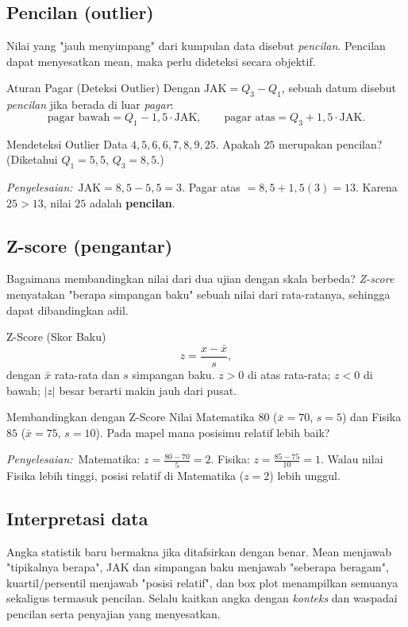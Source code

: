 \documentclass[11pt,a4paper]{report}
\theoremstyle{gaya}
\newcommand{\jawab}{\par\smallskip\noindent\textit{\textcolor{oranye}{Penyelesaian:}}\ }
\begin{document}
\subsection*{Pencilan (outlier)}
Nilai yang "jauh menyimpang" dari kumpulan data disebut \emph{pencilan}. Pencilan dapat menyesatkan mean, maka perlu dideteksi secara objektif.

\begin{konsep}{Aturan Pagar (Deteksi Outlier)}
Dengan $\text{JAK}=Q_3-Q_1$, sebuah datum disebut \emph{pencilan} jika berada di luar \emph{pagar}:
\[
\text{pagar bawah}=Q_1-1{,}5\cdot\text{JAK},\qquad
\text{pagar atas}=Q_3+1{,}5\cdot\text{JAK}.
\]
\end{konsep}

\begin{contoh}{Mendeteksi Outlier}
Data $4,5,6,6,7,8,9,25$. Apakah $25$ merupakan pencilan? (Diketahui $Q_1=5{,}5$, $Q_3=8{,}5$.)

\jawab $\text{JAK}=8{,}5-5{,}5=3$. Pagar atas $=8{,}5+1{,}5(3)=13$. Karena $25>13$, nilai $25$ adalah \textbf{pencilan}.
\end{contoh}

\subsection*{Z-score (pengantar)}
Bagaimana membandingkan nilai dari dua ujian dengan skala berbeda? \emph{Z-score} menyatakan "berapa simpangan baku" sebuah nilai dari rata-ratanya, sehingga dapat dibandingkan adil.

\begin{konsep}{Z-Score (Skor Baku)}
\[
z=\frac{x-\bar x}{s},
\]
dengan $\bar x$ rata-rata dan $s$ simpangan baku. $z>0$ di atas rata-rata; $z<0$ di bawah; $|z|$ besar berarti makin jauh dari pusat.
\end{konsep}

\begin{contoh}{Membandingkan dengan Z-Score}
Nilai Matematika $80$ ($\bar x=70$, $s=5$) dan Fisika $85$ ($\bar x=75$, $s=10$). Pada mapel mana posisimu relatif lebih baik?

\jawab Matematika: $z=\tfrac{80-70}{5}=2$. Fisika: $z=\tfrac{85-75}{10}=1$. Walau nilai Fisika lebih tinggi, posisi relatif di Matematika ($z=2$) lebih unggul.
\end{contoh}

\subsection*{Interpretasi data}
Angka statistik baru bermakna jika ditafsirkan dengan benar. Mean menjawab "tipikalnya berapa", JAK dan simpangan baku menjawab "seberapa beragam", kuartil/persentil menjawab "posisi relatif", dan box plot menampilkan semuanya sekaligus termasuk pencilan. Selalu kaitkan angka dengan \emph{konteks} dan waspadai pencilan serta penyajian yang menyesatkan.
\end{document}
